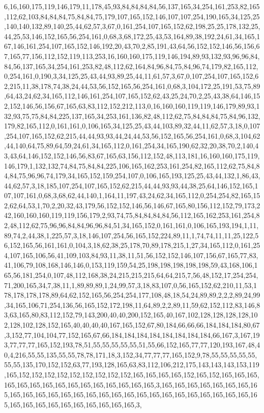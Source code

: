6,16,160,175,119,146,179,11,178,45,93,84,84,84,84,56,137,165,34,254,161,253,82,165,112,62,103,84,84,84,75,84,84,75,179,107,165,152,146,107,107,254,190,165,34,125,25,140,140,132,89,140,25,44,62,57,3,67,0,161,254,107,165,152,62,198,25,25,178,132,25,44,25,53,146,152,165,56,254,161,0,68,3,68,172,25,43,53,164,89,38,192,24,61,34,165,167,146,161,254,107,165,152,146,192,20,43,70,2,85,191,43,64,56,152,152,146,56,156,67,165,77,156,112,152,119,113,253,16,160,160,175,119,146,194,89,93,132,93,96,96,84,84,56,137,165,34,254,161,253,82,48,112,62,164,84,96,84,75,84,96,74,179,82,165,112,0,254,161,0,190,3,34,125,25,43,44,93,89,25,44,11,61,57,3,67,0,107,254,107,165,152,62,215,11,38,178,74,38,24,44,53,56,152,165,56,254,161,0,68,3,104,172,25,191,53,75,89,64,43,24,62,34,165,112,146,161,254,107,165,152,62,43,25,24,70,2,25,43,38,64,146,152,152,146,56,156,67,165,63,83,112,152,212,113,0,16,160,160,119,119,146,179,89,93,132,93,75,75,84,84,225,137,165,34,253,161,136,82,48,112,62,75,84,84,84,75,84,96,132,179,82,165,112,0,161,161,0,106,165,34,125,25,43,44,103,89,32,44,11,62,57,3,18,0,107,254,107,165,152,62,215,44,44,93,93,44,24,44,53,56,152,165,56,254,161,0,68,3,104,62,44,140,64,75,89,64,59,24,61,34,165,112,0,161,254,34,165,190,62,32,20,38,70,2,140,43,43,64,146,152,152,146,56,83,67,165,63,156,112,152,48,113,181,16,160,160,175,119,146,179,1,132,132,74,84,75,84,84,225,106,165,162,253,161,254,82,165,112,62,75,84,84,84,75,96,96,74,179,34,165,152,159,254,107,0,106,165,193,125,25,43,44,132,1,86,43,44,62,57,3,18,185,107,254,107,165,152,62,215,44,44,93,93,44,38,25,64,146,152,165,107,107,161,0,68,3,68,62,44,140,1,164,11,197,43,24,62,34,165,112,0,254,254,82,165,152,62,64,53,1,70,2,20,32,43,179,56,152,152,146,56,146,67,165,80,156,112,152,79,173,242,160,160,160,119,119,156,179,2,93,74,75,84,84,84,84,56,112,165,162,253,161,254,82,48,112,62,75,96,96,84,84,96,96,84,51,34,165,152,0,161,161,0,106,165,193,194,1,11,89,74,2,44,38,1,225,57,3,18,146,107,254,56,165,152,224,89,11,1,74,74,11,11,25,122,56,152,165,56,161,161,0,104,3,18,62,38,25,178,70,89,178,215,1,27,34,165,112,0,161,254,107,165,106,56,41,109,103,84,93,11,38,11,51,56,152,152,146,107,156,67,165,77,83,41,106,79,108,168,146,146,0,153,119,159,54,25,198,198,198,198,198,59,43,168,106,165,56,181,254,0,107,48,112,168,38,24,215,215,215,64,64,215,7,56,48,152,17,254,254,71,200,165,34,7,38,11,1,89,89,89,1,24,99,57,3,18,83,107,0,56,165,152,62,210,11,53,178,178,178,178,89,64,62,152,165,56,254,254,177,108,48,18,54,24,89,89,2,2,2,89,24,99,34,165,106,71,254,136,56,165,152,172,198,11,64,89,2,2,89,11,59,62,152,112,83,146,83,63,165,80,83,112,152,79,143,200,40,40,200,152,165,40,167,102,128,128,128,128,102,128,102,128,152,165,40,40,40,40,167,165,152,67,80,184,66,66,66,184,184,184,80,67,3,152,77,104,104,77,152,165,67,66,184,184,184,184,184,184,184,184,66,167,3,167,193,77,77,77,165,152,193,78,51,55,55,55,55,55,51,55,66,152,165,77,77,120,193,167,48,40,4,216,55,55,135,55,55,78,78,171,18,3,152,34,77,77,77,165,152,9,78,55,55,55,55,55,55,55,135,170,152,152,63,77,193,128,165,63,83,112,106,212,175,143,143,143,153,119,165,152,152,152,152,152,152,152,152,152,165,165,165,165,152,165,152,165,165,165,165,165,165,165,165,165,165,165,165,165,165,165,3,165,165,165,165,165,165,165,165,165,165,165,165,165,165,165,165,165,165,165,165,165,165,165,165,165,165,165,165,165,165,165,165,165,165,165,165,165,165,3,